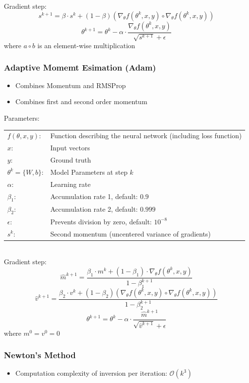 \documentclass[10pt,a4paper]{article}
\begin{document}
Gradient step:
$$
	s^{k + 1} = \beta ⋅ s^k + (1 - \beta)(\nabla_\theta f(\theta^k, x, y) \circ \nabla_\theta f(\theta^k, x, y))
$$
$$
	\theta^{k + 1} = \theta^k - \alpha ⋅ \frac{\nabla_\theta f(\theta^k, x, y)}{\sqrt{s^{k + 1}} + \epsilon}
$$
where $a \circ b$ is an element-wise multiplication

\subsubsection{Adaptive Momemt Esimation (Adam)}
\begin{itemize}
	\item Combines Momentum and RMSProp
	\item Combines first and second order momentum
\end{itemize}

Parameters: \\
\begin{tabular}{ll}
	$f(\theta, x, y)$: & Function describing the neural network (including loss function) \\
	$x$: & Input vectors \\
	$y$: & Ground truth \\
	$\theta^k = \{W, b\}$: & Model Parameters at step $k$\\
	$\alpha$: & Learning rate \\
	$\beta_1$: & Accumulation rate 1, default: $0.9$ \\
	$\beta_2$: & Accumulation rate 2, default: $0.999$ \\
	$\epsilon$: & Prevents division by zero, default: $10^{-8}$ \\
	$s^k$: & Second momentum (uncentered variance of gradients)
\end{tabular} \\

Gradient step:
$$
	\hat m^{k + 1} = \frac{\beta_1 ⋅ m^k + (1 -\beta_1) ⋅ \nabla_\theta f(\theta^k, x, y)}{1 - \beta_1^{k + 1}}
$$
$$
	\hat v^{k + 1} = \frac{\beta_2 ⋅ v^k + (1 - \beta_2)(\nabla_\theta f(\theta^k, x, y) \circ \nabla_\theta f(\theta^k, x, y))}{1 - \beta_2^{k + 1}}
$$
$$
	\theta^{k + 1} = \theta^k - \alpha ⋅ \frac{\hat m^{k + 1}}{\sqrt{\hat v^{k + 1}} + \epsilon}
$$
where $m^0 = v^0 = 0$

\subsubsection{Newton's Method}
\begin{itemize}
	\item Computation complexity of inversion per iteration: $\mathcal O(k^3)$
\end{itemize}
\end{document}

